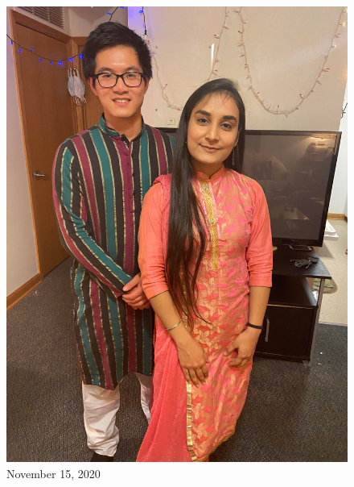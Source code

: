 \documentclass[
]{book}
\begin{document}
\begin{figure}
\centering
\includegraphics[width=5.20833in,height=\textheight]{mimages/4.1 11-15-2020.jpg}
\caption{November 15, 2020}
\end{figure}
\end{document}
